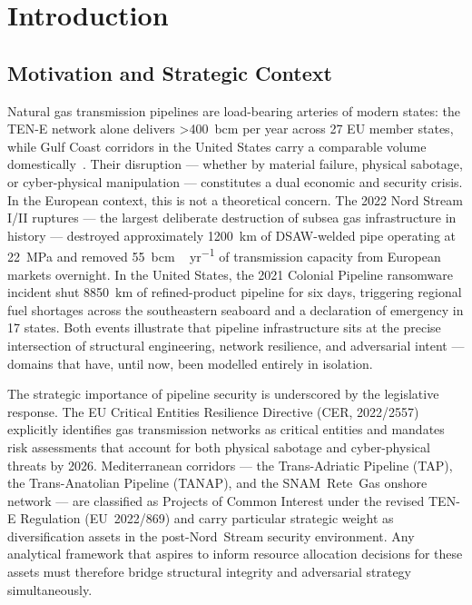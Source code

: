 
\chapter{Introduction}
\label{ch:introduction}

\section{Motivation and Strategic Context}
\label{sec:intro_motivation}

Natural gas transmission pipelines are load-bearing arteries of modern
states: the \ac{TEN-E} network alone delivers \SI{>400}{bcm}
per year across 27 EU member states, while Gulf Coast corridors in the
United States carry a comparable volume domestically~\cite{PHMSA2024}.
Their disruption — whether by material failure, physical sabotage, or
cyber-physical manipulation — constitutes a dual economic and security
crisis.  In the European context, this is not a theoretical concern.
The 2022 Nord Stream I/II ruptures — the largest deliberate destruction
of subsea gas infrastructure in history — destroyed approximately
\SI{1200}{\kilo\meter} of DSAW-welded pipe operating at \SI{22}{\mega\pascal}
and removed \SI{55}{bcm\,yr^{-1}} of transmission
capacity from European markets overnight.  In the United States, the
2021 Colonial Pipeline ransomware incident shut \SI{8850}{\kilo\meter}
of refined-product pipeline for six days, triggering regional fuel
shortages across the southeastern seaboard and a declaration of emergency
in 17 states.  Both events illustrate that pipeline infrastructure sits
at the precise intersection of structural engineering, network resilience,
and adversarial intent — domains that have, until now, been modelled
entirely in isolation.

The strategic importance of pipeline security is underscored by the
legislative response.  The EU Critical Entities Resilience Directive
(CER, 2022/2557) explicitly identifies gas transmission networks as
critical entities and mandates risk assessments that account for both
physical sabotage and cyber-physical threats by 2026.  Mediterranean
corridors — the Trans-Adriatic Pipeline (\ac{TAP}), the Trans-Anatolian
Pipeline (TANAP), and the SNAM~Rete~Gas onshore network — are classified
as Projects of Common Interest under the revised \ac{TEN-E} Regulation
(EU~2022/869) and carry particular strategic weight as diversification
assets in the post-Nord~Stream security environment.  Any analytical
framework that aspires to inform resource allocation decisions for these
assets must therefore bridge structural integrity and adversarial
strategy simultaneously.

